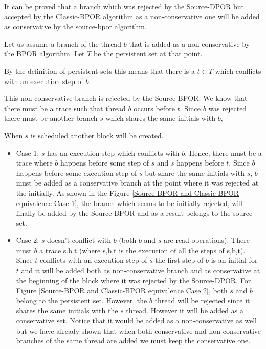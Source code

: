 It can be proved that a branch which was rejected by the Source-DPOR but accepted by the Classic-BPOR algorithm as a non-conservative one will be added as 
conservative by the source-bpor algorithm.

Let us assume a branch of the thread $b$ that is added as a non-conservative by the BPOR algorithm. Let $T$ be the persistent set at that point.

By the definition of persistent-sets this means that there is a $t \in T$ which
conflicts with an execution step of $b$. 

This non-conservative branch is rejected by the Source-BPOR. We know that there must be
 a trace such that thread $b$ occurs before $t$. Since $b$ was rejected there must be another branch $s$ which shares the same initials
  with $b$, 
  
When $s$ is scheduled another block will be created.
 
\begin{itemize}

\item Case 1: $s$ has an execution step which conflicts with $b$. Hence, there must be a trace where $b$ happens before some step of $s$ and $s$ 
happens before $t$. Since $b$ happens-before some execution step of $s$ but share the same initials with $s$, $b$ must be added as a conservative
branch at the point where it was rejected at the initially.
As shown in the Figure \ref{Source-BPOR and Classic-BPOR equivalence Case 1}, the branch which seems to be initially rejected, 
will finally be added by the Source-BPOR and as a result belongs to the source-set. 
   
\item Case 2: 
   $s$ doesn’t conflict with $b$ (both $b$ and $s$ are read operations). There must $b$ a trace s.b.t (where s,b,t is the execution
   of all the steps of s,b,t). 
   Since $t$ conflicts with an execution step of $s$ the first step of $b$ is an initial for $t$ and it will be added both as non-conservative branch and 
   as conservative at the beginning of the block where it was rejected by the Source-DPOR. For Figure \ref{Source-BPOR and Classic-BPOR equivalence Case 2}, both $s$ and $b$ belong to the persistent set. However,
   the $b$ thread will be rejected since it shares the same initials with the $s$ thread. However it will be added as a conservative set. Notice that it would be added as a
   non-conservative as well but we have already shown that when both conservative and non-conservative branches of the same thread are added we must keep the conservative one.

\end{itemize}
   
